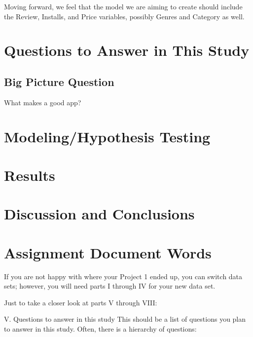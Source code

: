 \documentclass[]{article}
\begin{document}
Moving forward, we feel that the model we are aiming to create should
include the Review, Installs, and Price variables, possibly Genres and
Category as well.

\hypertarget{questions-to-answer-in-this-study}{%
\section{Questions to Answer in This
Study}\label{questions-to-answer-in-this-study}}

\hypertarget{big-picture-question}{%
\subsection{Big Picture Question}\label{big-picture-question}}

What makes a good app?

\hypertarget{modelinghypothesis-testing}{%
\section{Modeling/Hypothesis Testing}\label{modelinghypothesis-testing}}

\hypertarget{results}{%
\section{Results}\label{results}}

\hypertarget{discussion-and-conclusions}{%
\section{Discussion and Conclusions}\label{discussion-and-conclusions}}

\hypertarget{assignment-document-words}{%
\section{Assignment Document Words}\label{assignment-document-words}}

If you are not happy with where your Project 1 ended up, you can switch
data sets; however, you will need parts I through IV for your new data
set.

Just to take a closer look at parts V through VIII:

V. Questions to answer in this study This should be a list of questions
you plan to answer in this study. Often, there is a hierarchy of
questions:
\end{document}
